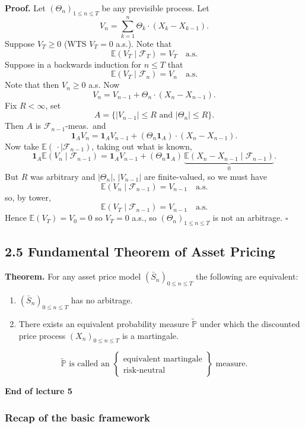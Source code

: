 \documentclass[11pt,a4paper]{article}
\begin{document}
\medskip
\noindent\textbf{Proof.}
Let $(\Theta_n)_{1\leq n\leq T}$ be any previsible process. Let
\[
V_n=\sum_{k=1}^n\Theta_k\cdot(X_k-X_{k-1}).
\]
Suppose $V_T\geq0$ (WTS $V_T=0$ a.s.).
Note that
\[
\mathbb E(V_T\mid\mathcal F_T)=V_T\quad\text{a.s.}
\]
Suppose in a backwards induction for $n\leq T$ that
\[
\mathbb E(V_T\mid\mathcal F_n)=V_n\quad\text{a.s.}
\]
Note that then $V_n\geq0$ a.s.
Now
\[
V_n=V_{n-1}+\Theta_n\cdot(X_n-X_{n-1}).
\]
Fix $R<\infty$, set
\[
A=\{|V_{n-1}|\leq R\text{ and }|\Theta_n|\leq R\}.
\]
Then $A$ is $\mathcal F_{n-1}$-meas.\ and
\[
\mathbf1_AV_n=\mathbf1_AV_{n-1}
+(\Theta_n\mathbf1_A)\cdot(X_n-X_{n-1}).
\]
Now take $\mathbb E(\,\cdot\mid\mathcal F_{n-1})$, taking out what is known,
\[
\mathbf1_A\mathbb E(V_n\mid\mathcal F_{n-1})
=\mathbf1_AV_{n-1}+(\Theta_n\mathbf1_A)\,
\underbrace{\mathbb E(X_n-X_{n-1}\mid\mathcal F_{n-1})}_{0}.
\]
But $R$ was arbitrary and $|\Theta_n|$, $|V_{n-1}|$ are finite-valued,
so we must have
\[
\mathbb E(V_n\mid\mathcal F_{n-1})=V_{n-1}\quad\text{a.s.}
\]
so, by tower,
\[
\mathbb E(V_T\mid\mathcal F_{n-1})=V_{n-1}\quad\text{a.s.}
\]
Hence $\mathbb E(V_T)=V_0=0$ so $V_T=0$ a.s., so
$(\Theta_n)_{1\leq n\leq T}$ is not an arbitrage.
\hfill$\square$

\subsection*{2.5 Fundamental Theorem of Asset Pricing}

\noindent\textbf{Theorem.}
For any asset price model $(\bar S_n)_{0\leq n\leq T}$ the following are equivalent:
\begin{enumerate}
    \item[(a)] $(\bar S_n)_{0\leq n\leq T}$ has no arbitrage.
    \item[(b)] There exists an equivalent probability measure $\widetilde{\mathbb P}$
    under which the discounted price process $(X_n)_{0\leq n\leq T}$
    is a martingale.
\end{enumerate}
\[
\widetilde{\mathbb P}\text{ is called an }
\left\{\begin{array}{l}
\text{equivalent martingale}\\
\text{risk-neutral}
\end{array}\right\}\text{ measure}.
\]

\begin{center}
\textbf{End of lecture 5}
\end{center}

\subsubsection*{Recap of the basic framework}
\end{document}
